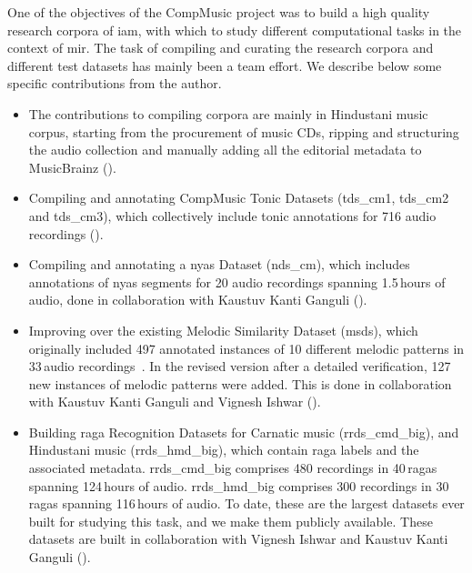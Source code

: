 One of the objectives of the CompMusic project was to build a high quality research corpora of \gls{iam}, with which to study different computational tasks in the context of \gls{mir}. The task of compiling and curating the research corpora and different test datasets has mainly been a team effort. We describe below some specific contributions from the author. 

\begin{itemize}
	
	\item The contributions to compiling corpora are mainly in Hindustani music corpus, starting from the procurement of music CDs, ripping and structuring the audio collection and manually adding all the editorial metadata to MusicBrainz (). 

	\item Compiling and annotating CompMusic Tonic Datasets (\acrshort{tds_cm1}, \acrshort{tds_cm2} and \acrshort{tds_cm3}), which collectively include tonic annotations for 716 audio recordings ().	
	
	\item Compiling and annotating a \Gls{nyas} Dataset (\acrshort{nds_cm}), which includes annotations of \gls{nyas} segments for 20 audio recordings spanning 1.5\,hours of audio, done in collaboration with Kaustuv Kanti Ganguli (). 
	
	\item Improving over the existing Melodic Similarity Dataset (\acrshort{msds}), which originally included 497 annotated instances of 10 different melodic patterns in 33\,audio recordings~\citep{Ishwar2013,Ross2012b}. In the revised version after a detailed verification, 127\,new instances of melodic patterns were added. This is done in collaboration with Kaustuv Kanti Ganguli and Vignesh Ishwar ().
	
	\item Building \Gls{raga} Recognition Datasets for Carnatic music (\acrshort{rrds_cmd_big}), and Hindustani music (\acrshort{rrds_hmd_big}), which contain \gls{raga} labels and the associated metadata. \acrshort{rrds_cmd_big} comprises 480 recordings in 40\,\glspl{raga} spanning 124\,hours of audio. \acrshort{rrds_hmd_big} comprises 300 recordings in 30\,\glspl{raga} spanning 116\,hours of audio. To date, these are the largest datasets ever built for studying this task, and we make them publicly available. These datasets are built in collaboration with Vignesh Ishwar and Kaustuv Kanti Ganguli ().
	
\end{itemize}

